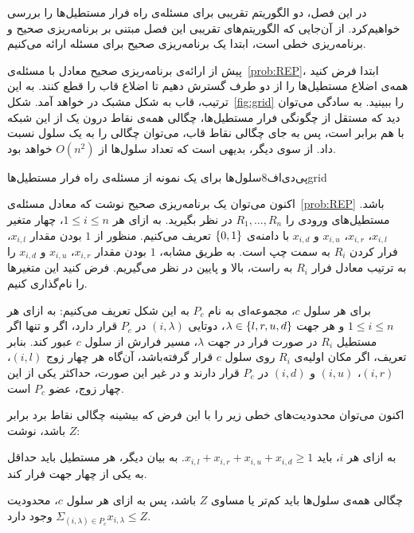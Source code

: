 

در این فصل، دو الگوریتم تقریبی برای مسئله‌ی راه فرار مستطیل‌ها را بررسی خواهیم‌کرد. از آن‌جایی که الگوریتم‌های تقریبی این فصل مبتنی بر برنامه‌ریزی صحیح و برنامه‌ریزی خطی است، ابتدا یک برنامه‌ریزی صحیح برای مسئله ارائه می‌کنیم.

پیش از ارائه‌ی برنامه‌ریزی صحیح معادل با مسئله‌ی~\ref{prob:REP}، ابتدا فرض کنید همه‌ی اضلاع مستطیل‌ها را از دو طرف گسترش دهیم تا اضلاع قاب را قطع کنند. به این ترتیب، قاب به شکل مشبک در خواهد آمد. شکل~\ref{fig:grid} را ببینید. به سادگی می‌توان دید که مستقل از چگونگی فرار مستطیل‌ها، چگالی همه‌ی نقاط درون یک  از این شبکه با هم برابر است، پس به جای چگالی نقاط قاب، می‌توان چگالی را به یک سلول نسبت داد. از سوی دیگر، بدیهی است که تعداد سلول‌ها از $O(n ^ 2)$ خواهد بود. 

‌پی‌دی‌اف{8}{سلول‌ها برای یک نمونه از مسئله‌ی راه فرار مستطیل‌ها}{grid}

اکنون می‌توان یک برنامه‌ریزی صحیح نوشت که معادل مسئله‌ی~\ref{prob:REP}  باشد. مستطیل‌های ورودی را $R_{1}, \ldots, R_{n}$ در نظر بگیرید. به ازای هر $1 \leq i \leq n$، چهار متغیر $x_{i, l}$، $x_{i, r}$، $x_{i, u}$ و $x_{i, d}$ با دامنه‌ی ${\{ 0, 1 \}}$ تعریف می‌کنیم. منظور از $1$ بودن مقدار $x_{i, l}$، فرار کردن $R_{i}$ به سمت چپ است. به طریق مشابه، $1$ بودن مقدار $x_{i, r}$، $x_{i, u}$ و $x_{i, d}$ را به ترتیب معادل فرار $R_{i}$ به راست، بالا و پایین در نظر می‌گیریم. فرض کنید این متغیر‌ها را  نام‌گذاری کنیم.

برای هر سلول $c$، مجموعه‌ای به نام $P_{c}$ به این شکل تعریف می‌کنیم: به ازای هر $1 \leq i \leq n$ و هر جهت $\lambda \in {\{ l, r, u, d \}}$، دوتایی $(i, \lambda)$ در $P_{c}$ قرار دارد، اگر و تنها اگر مستطیل $R_{i}$ در صورت فرار در جهت $\lambda$، مسیر فرارش از سلول $c$ عبور کند. بنابر تعریف، اگر مکان اولیه‌ی $R_{i}$ روی سلول $c$ قرار گرفته‌باشد، آن‌گاه هر چهار زوج $(i, l)$، $(i, r)$، $(i, u)$ و $(i, d)$ در $P_{c}$ قرار دارند و در غیر این صورت، حد‌اکثر یکی از این چهار زوج، عضو $P_{c}$ است.

اکنون می‌توان محدودیت‌های خطی زیر را با این فرض که بیشینه چگالی نقاط برد برابر $Z$ باشد، نوشت:


 به ازای هر $i$، باید $x_{i, l} + x_{i, r} + x_{i, u} + x_{i, d} \geq 1$. به بیان دیگر، هر مستطیل باید حد‌اقل به یکی از چهار جهت فرار کند.

 چگالی همه‌ی سلول‌ها باید کم‌تر یا مساوی $Z$ باشد، پس به ازای هر سلول $c$، محدودیت $\Sigma_{(i, \lambda) \in P_{c}} x_{i, \lambda} \leq Z$ وجود دارد.

